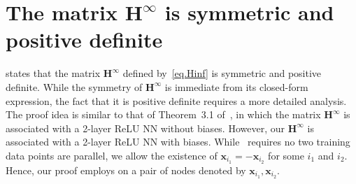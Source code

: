 \section{The matrix $\mathbf{\mathbf{H}^\infty}$ is symmetric and positive definite}\label{sec:HisSPD}
 states that the matrix $\mathbf{H}^\infty$ defined by~\cref{eq.Hinf} is symmetric and positive definite. While the symmetry of $\mathbf{H}^\infty$ is immediate from its closed-form expression, the fact that it is positive definite requires a more detailed analysis. The proof idea is similar to that of Theorem~3.1 of~\citep{du}, in which the matrix $\mathbf{H}^\infty$ is associated with a 2-layer ReLU NN without biases. However, our $\mathbf{H}^\infty$ is associated with a 2-layer ReLU NN with biases. While~\citep{du} requires no two training data points are parallel, we allow the existence of $\mathbf{x}_{i_1} = -\mathbf{x}_{i_2}$ for some $i_1$ and $i_2$. Hence, our proof employs on a pair of nodes denoted by $\mathbf{x}_{i_1}, \mathbf{x}_{i_2}$. 
